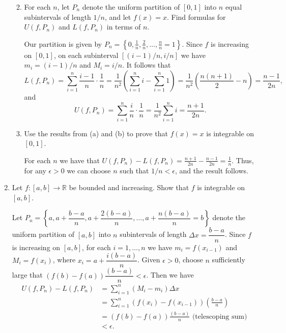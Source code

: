\documentclass[letterpaper,12pt]{article}
\newcommand{\R}{\mathbb{R}}
\begin{document}
\begin{enumerate}
\begin{enumerate}
\bigskip

 \item For each $n$, let $P_n$ denote the uniform partition of $[0,1]$ into $n$ equal subintervals of length $1/n$, and let $f(x)=x$. Find formulas for $U(f,P_n)$ and $L(f,P_n)$ in terms of $n$.

\bigskip

Our partition is given by $P_n = \left\{0,\frac{1}{n},\frac{2}{n},\ldots, \frac{n}{n}=1\right\}$. Since $f$ is increasing on $[0,1]$, on each subinterval $[(i-1)/n,i/n]$ we have $m_i = (i-1)/n$ and $M_i = i/n$. It follows that 
\[
 L(f,P_n) = \sum_{i=1}^n\frac{i-1}{n}\cdot\frac{1}{n} = \frac{1}{n^2}\left(\sum_{i=1}^ni-\sum_{i=1}^n1\right) = \frac{1}{n^2}\left(\frac{n(n+1)}{2}-n\right) = \frac{n-1}{2n},
\]
and
\[
 U(f,P_n) = \sum_{i=1}^n\frac{i}{n}\cdot \frac{1}{n} = \frac{1}{n^2}\sum_{i=1}^ni = \frac{n+1}{2n}.
\]


\bigskip

 \item Use the results from (a) and (b) to prove that $f(x)=x$ is integrable on $[0,1]$.

\bigskip

For each $n$ we have that $U(f,P_n)-L(f,P_n) = \frac{n+1}{2n}-\frac{n-1}{2n} = \frac{1}{n}$. Thus, for any $\epsilon>0$ we can choose $n$ such that $1/n<\epsilon$, and the result follows.

\bigskip

\end{enumerate}
 \item Let $f:[a,b]\to\R$ be bounded and increasing. Show that $f$ is integrable on $[a,b]$.

\bigskip

Let $P_n = \left\{a, a+\dfrac{b-a}{n}, a+\dfrac{2(b-a)}{n},\ldots, a+\dfrac{n(b-a)}{n}=b\right\}$ denote the uniform partition of $[a,b]$ into $n$ subintervals of length $\Delta x = \dfrac{b-a}{n}$. Since $f$ is increasing on $[a,b]$, for each $i=1,\ldots, n$ we have $m_i = f(x_{i-1})$ and $M_i = f(x_i)$, where $x_i = a+\dfrac{i(b-a)}{n}$. Given $\epsilon>0$, choose $n$ sufficiently large that $(f(b)-f(a))\dfrac{(b-a)}{n}<\epsilon$. Then we have
\begin{align*}
 U(f,P_n)-L(f,P_n) & = \sum_{i=1}^n(M_i-m_i)\Delta x\\
& = \sum_{i=1}^n(f(x_i)-f(x_{i-1}))\left(\frac{b-a}{n}\right)\\
& = (f(b)-f(a))\frac{(b-a)}{n} \text{ (telescoping sum)}\\
& < \epsilon.
\end{align*}



\end{enumerate}
\end{document}
